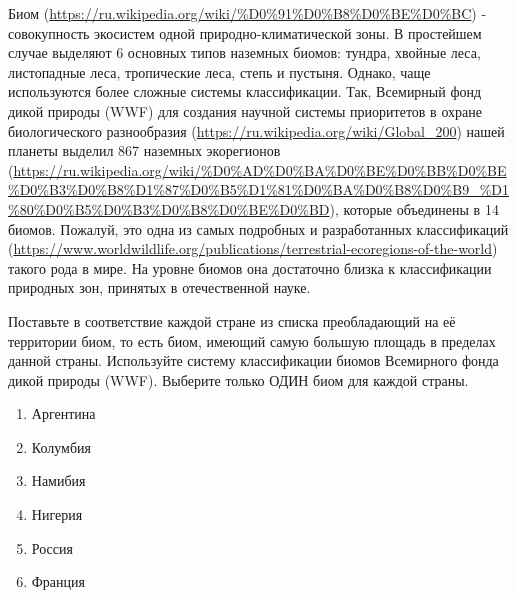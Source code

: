 
Биом (\url{https://ru.wikipedia.org/wiki/%D0%91%D0%B8%D0%BE%D0%BC}) - совокупность экосистем одной природно-климатической зоны. В простейшем случае выделяют 6 
основных типов наземных биомов: тундра, хвойные леса, листопадные леса, тропические леса, 
степь и пустыня. Однако, чаще используются более сложные системы классификации. Так, 
Всемирный фонд дикой природы (WWF) для создания научной системы приоритетов в охране 
биологического разнообразия (\url{https://ru.wikipedia.org/wiki/Global_200}) нашей планеты выделил 867 наземных экорегионов (\url{https://ru.wikipedia.org/wiki/%D0%AD%D0%BA%D0%BE%D0%BB%D0%BE%D0%B3%D0%B8%D1%87%D0%B5%D1%81%D0%BA%D0%B8%D0%B9_%D1%80%D0%B5%D0%B3%D0%B8%D0%BE%D0%BD}), которые объединены в 14 биомов. 
Пожалуй, это одна из самых подробных и разработанных классификаций (\url{https://www.worldwildlife.org/publications/terrestrial-ecoregions-of-the-world}) такого рода в мире. На уровне биомов она достаточно близка к классификации природных зон, принятых в отечественной науке.

Поставьте в соответствие каждой стране из списка преобладающий на её территории биом, то есть биом, имеющий самую большую площадь в пределах данной страны. Используйте систему классификации биомов Всемирного фонда дикой природы (WWF). Выберите только ОДИН биом для каждой страны.

    \begin{enumerate}
        \item Аргентина
        \item Колумбия
        \item Намибия
        \item Нигерия
        \item Россия
        \item Франция
    \end{enumerate}
    
